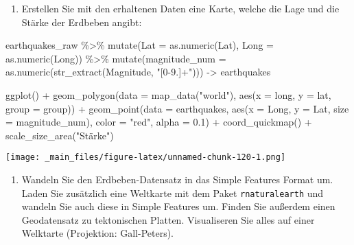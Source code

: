 \documentclass[
  ngerman,
]{article}
\newenvironment{Shaded}{\begin{snugshade}}{\end{snugshade}}
\newcommand{\AttributeTok}[1]{\textcolor[rgb]{0.77,0.63,0.00}{#1}}
\newcommand{\FloatTok}[1]{\textcolor[rgb]{0.00,0.00,0.81}{#1}}
\newcommand{\FunctionTok}[1]{\textcolor[rgb]{0.00,0.00,0.00}{#1}}
\newcommand{\NormalTok}[1]{#1}
\newcommand{\OtherTok}[1]{\textcolor[rgb]{0.56,0.35,0.01}{#1}}
\newcommand{\SpecialCharTok}[1]{\textcolor[rgb]{0.00,0.00,0.00}{#1}}
\newcommand{\StringTok}[1]{\textcolor[rgb]{0.31,0.60,0.02}{#1}}
\providecommand{\tightlist}{%
  \setlength{\itemsep}{0pt}\setlength{\parskip}{0pt}}
\begin{document}
\begin{enumerate}
\def\labelenumi{\arabic{enumi}.}
\setcounter{enumi}{1}
\tightlist
\item
  Erstellen Sie mit den erhaltenen Daten eine Karte, welche die Lage und die Stärke der Erdbeben angibt:
\end{enumerate}

\begin{Shaded}
\begin{Highlighting}[]
\NormalTok{earthquakes\_raw }\SpecialCharTok{\%\textgreater{}\%}
  \FunctionTok{mutate}\NormalTok{(}\AttributeTok{Lat =} \FunctionTok{as.numeric}\NormalTok{(Lat), }\AttributeTok{Long =} \FunctionTok{as.numeric}\NormalTok{(Long)) }\SpecialCharTok{\%\textgreater{}\%}
  \FunctionTok{mutate}\NormalTok{(}\AttributeTok{magnitude\_num =} \FunctionTok{as.numeric}\NormalTok{(}\FunctionTok{str\_extract}\NormalTok{(Magnitude, }\StringTok{"[0{-}9.]+"}\NormalTok{))) }\OtherTok{{-}\textgreater{}}\NormalTok{ earthquakes}

\FunctionTok{ggplot}\NormalTok{() }\SpecialCharTok{+}
  \FunctionTok{geom\_polygon}\NormalTok{(}\AttributeTok{data =} \FunctionTok{map\_data}\NormalTok{(}\StringTok{"world"}\NormalTok{), }\FunctionTok{aes}\NormalTok{(}\AttributeTok{x =}\NormalTok{ long, }\AttributeTok{y =}\NormalTok{ lat, }\AttributeTok{group =}\NormalTok{ group)) }\SpecialCharTok{+}
  \FunctionTok{geom\_point}\NormalTok{(}\AttributeTok{data =}\NormalTok{ earthquakes,}
             \FunctionTok{aes}\NormalTok{(}\AttributeTok{x =}\NormalTok{ Long, }\AttributeTok{y =}\NormalTok{ Lat, }\AttributeTok{size =}\NormalTok{ magnitude\_num),}
             \AttributeTok{color =} \StringTok{"red"}\NormalTok{, }\AttributeTok{alpha =} \FloatTok{0.1}\NormalTok{) }\SpecialCharTok{+}
  \FunctionTok{coord\_quickmap}\NormalTok{() }\SpecialCharTok{+}
  \FunctionTok{scale\_size\_area}\NormalTok{(}\StringTok{"Stärke"}\NormalTok{)}
\end{Highlighting}
\end{Shaded}

\texttt{[image: \_main\_files/figure-latex/unnamed-chunk-120-1.png]}

\begin{enumerate}
\def\labelenumi{\arabic{enumi}.}
\setcounter{enumi}{2}
\tightlist
\item
  Wandeln Sie den Erdbeben-Datensatz in das Simple Features Format um. Laden Sie zusätzlich eine Weltkarte mit dem Paket \texttt{rnaturalearth} und wandeln Sie auch diese in Simple Features um. Finden Sie außerdem einen Geodatensatz zu tektonischen Platten. Visualiseren Sie alles auf einer Welktarte (Projektion: Gall-Peters).
\end{enumerate}
\end{document}
